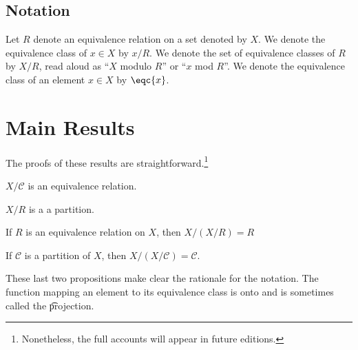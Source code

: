 \subsection*{Notation}

Let $R$ denote an equivalence relation on a set denoted by $X$.
We denote the equivalence class of $x \in X$ by $x / R$.
We denote the set of equivalence classes of $R$ by $X/R$, read aloud as ``$X$ modulo $R$'' or ``$x$ mod $R$''.
We denote the equivalence class of an element $x \in X$ by $\eqc{x}$.

\section*{Main Results}

The proofs of these results are straightforward.\footnote{Nonetheless, the full accounts will appear in future editions.}

\begin{proposition}
$X/\mathcal{C} $ is an equivalence relation.
\end{proposition}

\begin{proposition}
$X/R$ is a a partition.
\end{proposition}

\begin{proposition}
If $R$ is an equivalence relation on $X$, then $X/(X/R) = R$
\end{proposition}

\begin{proposition}
If $\mathcal{C} $ is a partition of $X$, then $X/(X/\mathcal{C} ) = \mathcal{C} $.
\end{proposition}

These last two propositions make clear the rationale for the notation.
The function mapping an element to its equivalence class is onto and is sometimes called the \t{projection}.
%  

